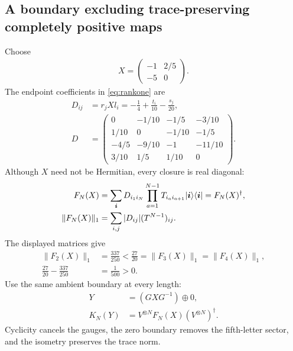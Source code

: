 \documentclass[aps,pra,reprint,nofootinbib,onecolumn]{revtex4-2}
\begin{document}
\subsection{A boundary excluding trace-preserving completely positive maps}

Choose
\begin{align}
	X=\begin{pmatrix}-1&2/5\\-5&0\end{pmatrix}.
	\label{eq:boundary-X}
\end{align}
The endpoint coefficients in \cref{eq:rankone} are
\begin{align}
	D_{ij} & =r_jXl_i=-\frac14+\frac{t_i}{10}-\frac{s_j}{20},\nonumber \\
	D      & =\begin{pmatrix}
		          0    & -1/10 & -1/5  & -3/10  \\
		          1/10 & 0     & -1/10 & -1/5   \\
		          -4/5 & -9/10 & -1    & -11/10 \\
		          3/10 & 1/5   & 1/10  & 0
	          \end{pmatrix}.
	\label{eq:D-matrix}
\end{align}
Although $X$ need not be Hermitian, every closure is real diagonal:
\begin{align}
	F_N(X)
	             & =\sum_{\boldsymbol i}
	D_{i_1i_N}\prod_{a=1}^{N-1}T_{i_ai_{a+1}}
	\lvert\boldsymbol i\rangle\langle\boldsymbol i\rvert
	=F_N(X)^\dagger,\nonumber                         \\
	\|F_N(X)\|_1 & =\sum_{i,j}|D_{ij}|(T^{N-1})_{ij}.
	\label{eq:norm}
\end{align}
The displayed matrices give
\begin{align}
	\|F_2(X)\|_1                  & =\frac{337}{250}
	<\frac{27}{20}=\|F_3(X)\|_1=\|F_4(X)\|_1,\nonumber \\
	\frac{27}{20}-\frac{337}{250} & =\frac1{500}>0.
	\label{eq:norm-gap}
\end{align}
Use the same ambient boundary at every length:
\begin{align}
	Y      & =(GXG^{-1})\oplus0,\nonumber                 \\
	K_N(Y) & =V^{\otimes N}F_N(X)(V^{\otimes N})^\dagger.
	\label{eq:boundary}
\end{align}
Cyclicity cancels the gauges, the zero boundary removes the
fifth-letter sector, and the isometry preserves the trace norm.
\end{document}
